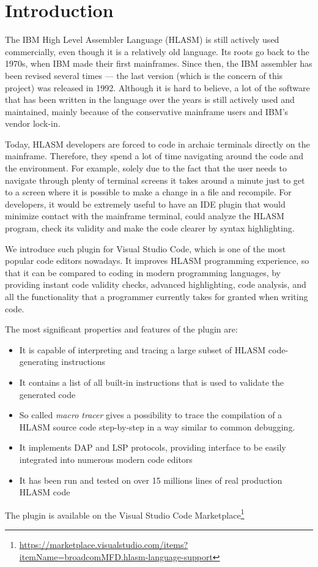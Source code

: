 \chapter{Introduction}

The IBM High Level Assembler Language (HLASM) is still actively used commercially, even though it is a relatively old language. Its roots go back to the 1970s, when IBM made their first mainframes. Since then, the IBM assembler has been revised several times --- the last version (which is the concern of this project) was released in 1992. Although it is hard to believe, a lot of the software that has been written in the language over the years is still actively used and maintained, mainly because of the conservative mainframe users and IBM's vendor lock-in.

Today, HLASM developers are forced to code in archaic terminals directly on the mainframe. Therefore, they spend a lot of time navigating around the code and the environment. For example, solely due to the fact that the user needs to navigate through plenty of terminal screens it takes around a minute just to get to a screen where it is possible to make a change in a file and recompile. For developers, it would be extremely useful to have an IDE plugin that would minimize contact with the mainframe terminal, could analyze the HLASM program, check its validity and make the code clearer by syntax highlighting. 

We introduce such plugin for Visual Studio Code, which is one of the most popular code editors nowadays. It improves HLASM programming experience, so that it can be compared to coding in modern programming languages, by providing instant code validity checks, advanced highlighting, code analysis, and all the functionality that a programmer currently takes for granted when writing code.

The most significant properties and features of the plugin are:
\begin{itemize}
	\item It is capable of interpreting and tracing a large subset of HLASM code-generating instructions
	\item It contains a list of all built-in instructions that is used to validate the generated code
	\item So called \emph{macro tracer} gives a possibility to trace the compilation of a HLASM source code step-by-step in a way similar to common debugging.
	\item It implements DAP and LSP protocols, providing interface to be easily integrated into numerous modern code editors
	\item It has been run and tested on over 15 millions lines of real production HLASM code
\end{itemize}
The plugin is available on the Visual Studio Code Marketplace\footnote{\url{https://marketplace.visualstudio.com/items?itemName=broadcomMFD.hlasm-language-support}}

